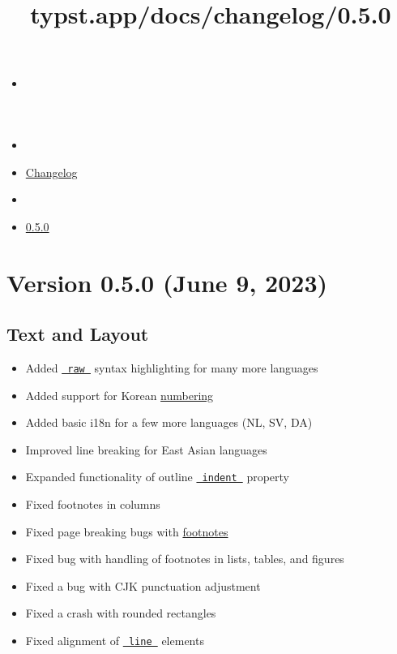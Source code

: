 \title{typst.app/docs/changelog/0.5.0}

\begin{itemize}
\tightlist
\item
  \href{/docs}{}
\item
  
\item
  \href{/docs/changelog/}{Changelog}
\item
  
\item
  \href{/docs/changelog/0.5.0/}{0.5.0}
\end{itemize}

\section{Version 0.5.0 (June 9, 2023)}\label{version-0.5.0-june-9-2023}

\subsection{Text and Layout}\label{text-and-layout}

\begin{itemize}
\tightlist
\item
  Added \href{/docs/reference/text/raw/}{\texttt{\ raw\ }} syntax
  highlighting for many more languages
\item
  Added support for Korean
  \href{/docs/reference/model/numbering/}{numbering}
\item
  Added basic i18n for a few more languages (NL, SV, DA)
\item
  Improved line breaking for East Asian languages
\item
  Expanded functionality of outline
  \href{/docs/reference/model/outline/\#parameters-indent}{\texttt{\ indent\ }}
  property
\item
  Fixed footnotes in columns
\item
  Fixed page breaking bugs with
  \href{/docs/reference/model/footnote/}{footnotes}
\item
  Fixed bug with handling of footnotes in lists, tables, and figures
\item
  Fixed a bug with CJK punctuation adjustment
\item
  Fixed a crash with rounded rectangles
\item
  Fixed alignment of
  \href{/docs/reference/visualize/line/}{\texttt{\ line\ }} elements
\end{itemize}

